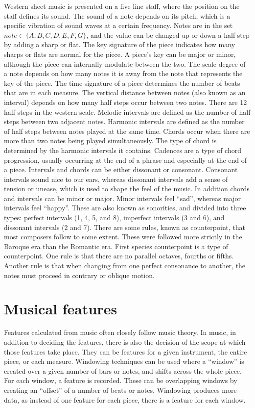 \documentclass[12pt,twoside]{reedthesis}
\theoremstyle{definition}
\theoremstyle{definition}
\theoremstyle{definition}
\theoremstyle{remark}
\begin{document}
Western sheet music is presented on a five line staff, where the
position on the staff defines its sound. The sound of a note depends on
its pitch, which is a specific vibration of sound waves at a certain
frequency. Notes are in the set \(note \in \{A,B,C,D,E,F,G\}\), and the
value can be changed up or down a half step by adding a sharp or flat.
The key signature of the piece indicates how many sharps or flats are
normal for the piece. A piece's key can be major or minor, although the
piece can internally modulate between the two. The scale degree of a
note depends on how many notes it is away from the note that represents
the key of the piece. The time signature of a piece determines the
number of beats that are in each measure. The vertical distance between
notes (also known as an interval) depends on how many half steps occur
between two notes. There are 12 half steps in the western scale. Melodic
intervals are defined as the number of half steps between two adjacent
notes. Harmonic intervals are defined as the number of half steps
between notes played at the same time. Chords occur when there are more
than two notes being played simultaneously. The type of chord is
determined by the harmonic intervals it contains. Cadences are a type of
chord progression, usually occurring at the end of a phrase and
especially at the end of a piece. Intervals and chords can be either
dissonant or consonant. Consonant intervals sound nice to our ears,
whereas dissonant intervals add a sense of tension or unease, which is
used to shape the feel of the music. In addition chords and intervals
can be minor or major. Minor intervals feel ``sad'', whereas major
intervals feel ``happy''. These are also known as sonorities, and
divided into three types: perfect intervals (1, 4, 5, and 8), imperfect
intervals (3 and 6), and dissonant intervals (2 and 7). There are some
rules, known as counterpoint, that most composers follow to some extent.
These were followed more strictly in the Baroque era than the Romantic
era. First species counterpoint is a type of counterpoint. One rule is
that there are no parallel octaves, fourths or fifths. Another rule is
that when changing from one perfect consonance to another, the notes
must proceed in contrary or oblique motion.

\section{Musical features}\label{musical-features}

Features calculated from music often closely follow music theory. In
music, in addition to deciding the features, there is also the decision
of the scope at which those features take place. They can be features
for a given instrument, the entire piece, or each measure. Windowing
techniques can be used where a ``window'' is created over a given number
of bars or notes, and shifts across the whole piece. For each window, a
feature is recorded. These can be overlapping windows by creating an
``offset'' of a number of beats or notes. Windowing produces more data,
as instead of one feature for each piece, there is a feature for each
window.
\end{document}

